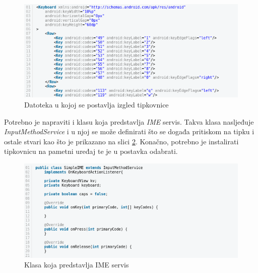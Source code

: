 \documentclass[times, utf8, zavrsni]{fer}
\begin{document}
\begin{figure}[htb]
\centering
\includegraphics[width=12cm]{img/keyboard_xml.png}
\caption{Datoteka u kojoj se postavlja izgled tipkovnice}
\label{fig:keyboard_xml}
\end{figure}

Potrebno je napraviti i klasu koja predstavlja \emph{IME} servis. Takva klasa nasljeđuje \emph{InputMethodService} i u njoj se može definirati što se događa pritiskom na tipku i ostale stvari kao što je prikazano na slici \ref{fig:klasa}. Konačno, potrebno je instalirati tipkovnicu na pametni uređaj te je u postavka odabrati.
\begin{figure}[htb]
\centering
\includegraphics[width=12cm]{img/klasa.png}
\caption{Klasa koja predstavlja IME servis}
\label{fig:klasa}
\end{figure}
\end{document}

